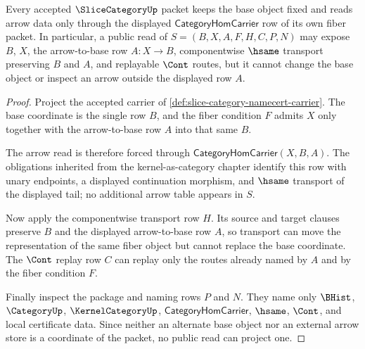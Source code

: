 \begin{theorem}
\label{thm:slice-category-kernel-fiber-obligation}
Every accepted $\SliceCategoryUp$ packet keeps the base object fixed and reads arrow data only through the displayed $\mathsf{CategoryHomCarrier}$ row of its own fiber packet. In particular, a public read of $S=(B,X,A,F,H,C,P,N)$ may expose $B$, $X$, the arrow-to-base row $A:X\to B$, componentwise $\hsame$ transport preserving $B$ and $A$, and replayable $\Cont$ routes, but it cannot change the base object or inspect an arrow outside the displayed row $A$.
\end{theorem}
\begin{proof}
Project the accepted carrier of \autoref{def:slice-category-namecert-carrier}. The base coordinate is the single row $B$, and the fiber condition $F$ admits $X$ only together with the arrow-to-base row $A$ into that same $B$.

The arrow read is therefore forced through $\mathsf{CategoryHomCarrier}(X,B,A)$. The obligations inherited from the kernel-as-category chapter identify this row with unary endpoints, a displayed continuation morphism, and $\hsame$ transport of the displayed tail; no additional arrow table appears in $S$.

Now apply the componentwise transport row $H$. Its source and target clauses preserve $B$ and the displayed arrow-to-base row $A$, so transport can move the representation of the same fiber object but cannot replace the base coordinate. The $\Cont$ replay row $C$ can replay only the routes already named by $A$ and by the fiber condition $F$.

Finally inspect the package and naming rows $P$ and $N$. They name only $\BHist$, $\CategoryUp$, $\KernelCategoryUp$, $\mathsf{CategoryHomCarrier}$, $\hsame$, $\Cont$, and local certificate data. Since neither an alternate base object nor an external arrow store is a coordinate of the packet, no public read can project one.
\end{proof}


